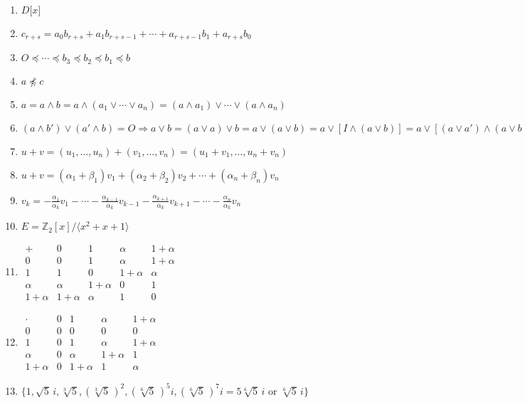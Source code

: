 \documentclass[oneside,10pt,]{article}
\begin{document}
\begin{enumerate}
\item{}\(D\lbrack x \rbrack\)%
\item{}\(c_{r + s} = a_0 b_{r + s} + a_1 b_{r + s - 1} + \cdots + a_{r + s - 1} b_1 + a_{r + s} b_0\)%
\item{}\(O \preceq \cdots \preceq b_3 \preceq b_2 \preceq b_1 \preceq b\)%
\item{}\(a \not\preceq c\)%
\item{}\(a = a \wedge b = a \wedge( a_1 \vee \cdots \vee a_n ) = (a \wedge a_1) \vee \cdots \vee ( a \wedge a_n )\)%
\item{}\(( a \wedge b') \vee (a' \wedge b) = O \Rightarrow a \vee b = (a \vee a) \vee b = a \vee (a \vee b) = a \vee [I \wedge (a \vee b)] = a \vee [(a \vee a') \wedge (a \vee b)] = [a \vee (a \wedge b')] \vee [a \vee (a' \wedge b)] = a \vee [(a \wedge b') \vee (a' \wedge b)] = a \vee 0 = a\)%
\item{}\(u + v = (u_1, \ldots, u_n) + (v_1, \ldots, v_n) = (u_1 + v_1, \ldots, u_n + v_n)\)%
\item{}\(u + v =( \alpha_1 + \beta_1) v_1 + (\alpha_2+ \beta_2) v_2 + \cdots + (\alpha_n + \beta_n) v_n\)%
\item{}\(v_k = - \frac{\alpha_1}{\alpha_k} v_1 - \cdots - \frac{\alpha_{k - 1}}{\alpha_k} v_{k-1} - \frac{\alpha_{k + 1}}{\alpha_k} v_{k + 1} - \cdots - \frac{\alpha_n}{\alpha_k} v_n\)%
\item{}\(E = {\mathbb Z}_2[x] / \langle x^2 + x + 1 \rangle\)%
\item{}\(\begin{array}{c|cccc} + & 0 & 1 & \alpha & 1 + \alpha \\ \hline 0 & 0 & 1 & \alpha & 1 + \alpha \\ 1 & 1 & 0 & 1 + \alpha & \alpha \\ \alpha & \alpha & 1 + \alpha & 0 & 1 \\ 1 + \alpha & 1 + \alpha & \alpha & 1 & 0 \end{array}\)%
\item{}\(\begin{array}{c|cccc} \cdot & 0 & 1 & \alpha & 1 + \alpha \\ \hline 0 & 0 & 0 & 0 & 0 \\ 1 & 0 & 1 & \alpha & 1 + \alpha \\ \alpha & 0 & \alpha & 1 + \alpha & 1 \\ 1 + \alpha & 0 & 1 + \alpha & 1 & \alpha \end{array}\)%
\item{}\(\{ 1, \sqrt{5}\, i, \sqrt[3]{5}, (\sqrt[3]{5}\, )^2, (\sqrt[6]{5}\, )^5 i, (\sqrt[6]{5}\, )^7 i = 5 \sqrt[6]{5}\, i \text{ or } \sqrt[6]{5}\, i \}\)%

\end{enumerate}
\end{document}
